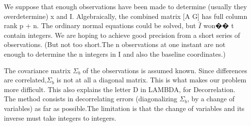 We suppose that enough observations have been made to determine (usually they
overdetermine) x and I. Algebraically, the combined matrix [A G] has full column rank p + n. The ordinary normal equations could be solved, but $\hat{I}$ won�� t contain integers. We are hoping to achieve good precision from a short series of observations. (But not too short.The n observations at one instant are not enough to determine the n integers in I and also the baseline coordinates.)

The covariance matrix $\Sigma_{b}$ of the observations is assumed known. Since differences are correlated,$\Sigma_{b}$ is not at all a diagonal matrix. This is what makes our problem more difficult. This also explains the letter D in LAMBDA, for Decorrelation. The method consists in decorrelating errors (diagonalizing $\Sigma_{b}$, by a change of variables) as far as possible.The limitation is that the change of variables and its inverse must take integers to integers.

